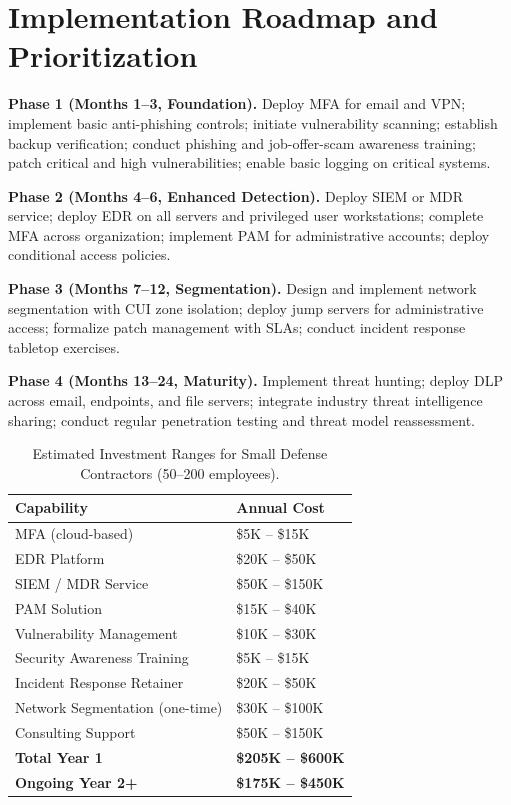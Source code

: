 \documentclass[sigconf,nonacm]{acmart}
\begin{document}
\section{Implementation Roadmap and Prioritization}

\textbf{Phase 1 (Months 1--3, Foundation).} Deploy MFA for email and VPN; implement
basic anti-phishing controls; initiate vulnerability scanning; establish backup
verification; conduct phishing and job-offer-scam awareness training; patch critical
and high vulnerabilities; enable basic logging on critical systems.

\textbf{Phase 2 (Months 4--6, Enhanced Detection).} Deploy SIEM or MDR service; deploy
EDR on all servers and privileged user workstations; complete MFA across organization;
implement PAM for administrative accounts; deploy conditional access policies.

\textbf{Phase 3 (Months 7--12, Segmentation).} Design and implement network segmentation
with CUI zone isolation; deploy jump servers for administrative access; formalize patch
management with SLAs; conduct incident response tabletop exercises.

\textbf{Phase 4 (Months 13--24, Maturity).} Implement threat hunting; deploy DLP across
email, endpoints, and file servers; integrate industry threat intelligence sharing;
conduct regular penetration testing and threat model reassessment.

\begin{table}[h]
\caption{Estimated Investment Ranges for Small Defense Contractors (50--200 employees).}
\label{tab:costs}
\small
\begin{tabularx}{\columnwidth}{@{}Xl@{}}
\toprule
\textbf{Capability} & \textbf{Annual Cost} \\
\midrule
MFA (cloud-based)           & \$5K -- \$15K    \\
EDR Platform                & \$20K -- \$50K   \\
SIEM / MDR Service          & \$50K -- \$150K  \\
PAM Solution                & \$15K -- \$40K   \\
Vulnerability Management    & \$10K -- \$30K   \\
Security Awareness Training & \$5K -- \$15K    \\
Incident Response Retainer  & \$20K -- \$50K   \\
Network Segmentation (one-time) & \$30K -- \$100K \\
Consulting Support          & \$50K -- \$150K  \\
\midrule
\textbf{Total Year 1}  & \textbf{\$205K -- \$600K} \\
\textbf{Ongoing Year 2+} & \textbf{\$175K -- \$450K} \\
\bottomrule
\end{tabularx}
\end{table}
\end{document}
